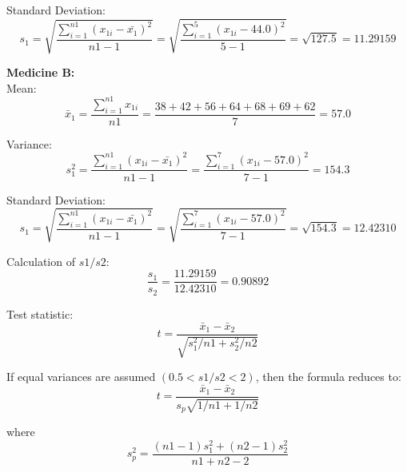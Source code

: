 \documentclass[a4paper,11pt,openright]{report}
\begin{document}
\begin{enumerate}
\hspace*{10mm} Standard Deviation:
\begin{equation*}
s_{1} = \sqrt{\frac{\sum\limits_{i=1}^{n1} (x_{1i} - \bar {x_{1}})^{2}}{n1 - 1}}
	= \sqrt{\frac{\sum\limits_{i=1}^{5} (x_{1i} - 44.0)^{2}}{5 -1}}
	= \sqrt{127.5} = 11.29159
\end{equation*}

\vspace{1cm}

\textbf{Medicine B:} \\
\hspace*{10mm} Mean:
\begin{equation*}
\bar x_{1} = \frac{\sum\limits_{i=1}^{n1} x_{1i}}{n1}
		= \frac{38 + 42 + 56 + 64 + 68 + 69 + 62}{7} = 57.0
\end{equation*}

\hspace*{10mm} Variance:
\begin{equation*}
s_{1}^{2} = \frac{\sum\limits_{i=1}^{n1} (x_{1i} - \bar {x_{1}})^{2}}{n1 - 1}
	= \frac{\sum\limits_{i=1}^{7} (x_{1i} - 57.0)^{2}}{7 - 1} = 154.3
\end{equation*}

\hspace*{10mm} Standard Deviation:
\begin{equation*}
s_{1} = \sqrt{\frac{\sum\limits_{i=1}^{n1} (x_{1i} - \bar {x_{1}})^{2}}{n1 - 1}}
	= \sqrt{\frac{\sum\limits_{i=1}^{7} (x_{1i} - 57.0)^{2}}{7 -1}}
	= \sqrt{154.3} = 12.42310
\end{equation*}

Calculation of $s1/s2$:
\begin{equation*}
\frac{s_{1}}{s_{2}} = \frac{11.29159}{12.42310} = 0.90892
\end{equation*}

Test statistic:
\begin{equation*}
t = \frac{\bar x_{1} - \bar x_{2}}{\sqrt{s_{1}^{2}/n1 + s_{2}^{2}/n2}}
\end{equation*}

If equal variances are assumed $(0.5 < s1/s2 < 2)$, then the formula reduces to:
\begin{equation*}
t = \frac{\bar x_{1} - \bar x_{2}}{s_{p} \sqrt{1/n1 + 1/n2}}
\end{equation*}

where
\begin{equation*}
s_{p}^{2} = \frac{(n1-1)s_{1}^{2} + (n2-1)s_{2}^{2}}{n1+n2-2}
\end{equation*}


\end{enumerate}
\end{document}
